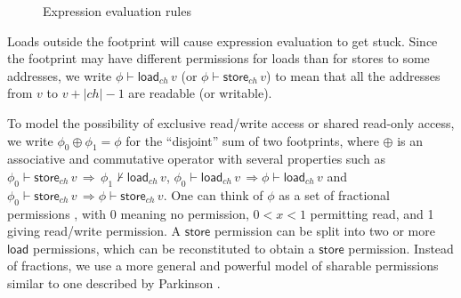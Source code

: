\documentclass{llncs}
\newcommand{\tyface}[1]{\ensuremath{\mathsf{#1}}}
\newcommand{\Eval}{\tyface{Eval}}
\newcommand{\Evar}{\tyface{Evar}}
\newcommand{\Eop}{\tyface{Eop}}
\newcommand{\Eload}{\tyface{Eload}}
\newcommand{\fmap}{\Psi}
\newcommand{\infootprint}[4]{#4 \vdash \tyface{#3}_#2\, #1}
\newcommand{\notinfootprint}[4]{#4 \not\vdash \tyface{#3}_#2\, #1}
\newcommand{\evalexpr}[7]{#1;(#2;#3;#4;#5) \vdash #6 \Downarrow #7}
\newcommand{\evaloperation}[5]{#1;#2 \vdash #3(#4) \Downarrow_\tyface{eval\_operation} #5}
\newcommand{\loadv}[4]{#1\vdash #2\stackrel{#3}{\mapsto}#4}
\DeclareMathOperator{\dom}{dom}
\begin{document}
\begin{figure}
\vspace{-35pt}
\vspace{-10pt}
\caption{Expression evaluation rules}
\label{evalexpr-fig}
\vspace{-10pt}
\end{figure}

Loads outside
the footprint will cause expression evaluation to get stuck.
Since the footprint may have different permissions for
loads than for stores to some addresses, we write 
$\infootprint{v}{\mathit{ch}}{load}\phi$
(or $\infootprint{v}{\mathit{ch}}{store}\phi$)
to mean that all the addresses from $v$ to
$v+\left|\mathit{ch}\right| -1$ are 
readable (or writable).


To model the possibility of exclusive read/write access or
shared read-only access, we write $\phi_0\oplus\phi_1=\phi$
for the ``disjoint'' sum of two footprints, 
where $\oplus$ is an associative and commutative 
operator with several properties such as
$\infootprint{v}{\mathit{ch}}{store}{\phi_0} \,\Rightarrow\,
\notinfootprint{v}{\mathit{ch}}{load}{\phi_1}$,
$\infootprint{v}{\mathit{ch}}{load}{\phi_0} \,\Rightarrow
\infootprint{v}{\mathit{ch}}{load}{\phi}$
and
$\infootprint{v}{\mathit{ch}}{store}{\phi_0} \,\Rightarrow
\infootprint{v}{\mathit{ch}}{store}{\phi}$.
One can think of $\phi$ as a set of fractional permissions
\cite{bornat05:popl},
with 0 meaning no permission, $0<x<1$ permitting read,
and 1 giving read/write permission.
A \tyface{store} permission can be split into
two or more \tyface{load} permissions,
which can be reconstituted to obtain a \tyface{store} permission.
Instead of fractions, we use a more general and powerful model of sharable 
permissions similar to one described by 
Parkinson \cite[Ch.~5]{parkinson05:phd}.
\end{document}
